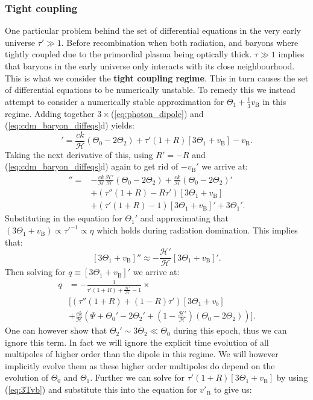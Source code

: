 \documentclass[%
reprint,
 amsmath,amssymb,
 aps,
]{revtex4-2}
\newcommand{\Hp}{\mathcal{H}}
\begin{document}
\subsubsection{Tight coupling}
One particular problem behind the set of differential equations in the very early universe $\tau'\gg1$. Before recombination when both radiation, and baryons where tightly coupled due to the primordial plasma being optically thick. $\tau\gg1$ implies that baryons in the early universe only interacts with its close neighbourhood. This is what we consider the \textbf{tight coupling regime}. This in turn causes the set of differential equations to be numerically unstable. To remedy this we instead attempt to consider a numerically stable approximation for $\Theta_1+\frac13v_\text{B}$ in this regime. Adding together $3\times$(\ref{eq:photon_dipole}) and (\ref{eq:cdm_baryon_diffeqs}d) yields:
\begin{equation}
	[3\Theta_1+v_\text{B}]'=\frac{ck}{\Hp}(\Theta_0-2\Theta_2)+\tau'(1+R)[3\Theta_1+v_\text{B}]-v_\text{B}.
	\label{eq:3Tvb}
\end{equation}
Taking the next derivative of this, using $R'=-R$ and (\ref{eq:cdm_baryon_diffeqs}d) again to get rid of $-v_\text{B}'$ we arrive at:
\begin{align*}
	[3\Theta_1+v_\text{B}]''=&-\frac{ck}{\Hp}\frac{\Hp'}{\Hp}(\Theta_0-2\Theta_2)+\frac{ck}{\Hp}(\Theta_0-2\Theta_2)'\\
	&+(\tau''(1+R)-R\tau')[3\Theta_1+v_\text{B}]\\
	&+(\tau'(1+R)-1)[3\Theta_1+v_\text{B}]'+3\Theta_1'.
\end{align*}
Substituting in the equation for $\Theta_1'$ and approximating that $(3\Theta_1+v_\text{B})\propto\tau'^{-1}\propto\eta$ which holds during radiation domination. This implies that:
\[[3\Theta_1+v_\text{B}]''\approx-\frac{\Hp'}{\Hp}[3\Theta_1+v_\text{B}]'.\]
Then solving for $q\equiv[3\Theta_1+v_\text{B}]'$ we arrive at:
\begin{align*}
	q&=-\frac{1}{\tau'(1+R)+\frac{\Hp'}{\Hp}-1}\times\\
	&\biggl[(\tau''(1+R)+(1-R)\tau')[3\Theta_1+v_b]\\
	&+\frac{ck}{\Hp}\left(\Psi+\Theta_0'-2\Theta_2'+\left(1-\frac{\Hp'}{\Hp}\right)(\Theta_0-2\Theta_2)\right)\biggr].
\end{align*}
One can however show that $\Theta_2'\sim3\Theta_2\ll\Theta_0$ during this epoch, thus we can ignore this term. In fact we will ignore the explicit time evolution of all multipoles of higher order than the dipole in this regime. We will however implicitly evolve them as these higher order multipoles do depend on the evolution of $\Theta_0$ and $\Theta_1$. Further we can solve for $\tau'(1+R)[3\Theta_1+v_\text{B}]$ by using (\ref{eq:3Tvb}) and substitute this into the equation for $v'_\text{B}$ to give us:
\end{document}

